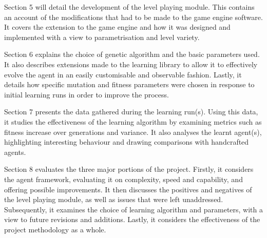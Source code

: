 Section 5 will detail the development of the level playing module. This contains an account of the modifications that had to be made to the game engine software. It covers the extension to the game engine and how it was designed and implemented with a view to parametrisation and level variety.

Section 6 explains the choice of genetic algorithm and the basic parameters used. It also describes extensions made to the learning library to allow it to effectively evolve the agent in an easily customisable and observable fashion. Lastly, it details how specific mutation and fitness parameters were chosen in response to initial learning runs in order to improve the process.

Section 7 presents the data gathered during the learning run(s). Using this data, it studies the effectiveness of the learning algorithm by examining metrics such as fitness increase over generations and variance. It also analyses the learnt agent(s), highlighting interesting behaviour and drawing comparisons with handcrafted agents.

Section 8 evaluates the three major portions of the project. Firstly, it considers the agent framework, evaluating it on complexity, speed and capability, and offering possible improvements. It then discusses the positives and negatives of the level playing module, as well as issues that were left unaddressed. Subsequently, it examines the choice of learning algorithm and parameters, with a view to future revisions and additions. Lastly, it considers the effectiveness of the project methodology as a whole.



